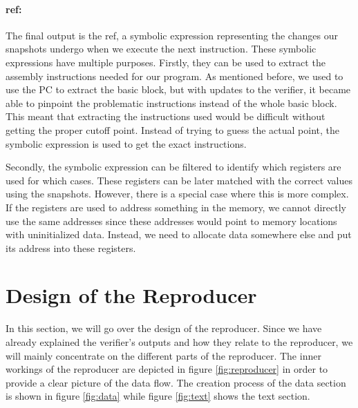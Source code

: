 \paragraph{ref:}
The final output is the ref, a symbolic expression representing the changes our snapshots undergo when we execute the next instruction.
These symbolic expressions have multiple purposes.
Firstly, they can be used to extract the assembly instructions needed for our program.
As mentioned before, we used to use the PC to extract the basic block, but with updates to the verifier, it became able to pinpoint the problematic instructions instead of the whole basic block.
This meant that extracting the instructions used would be difficult without getting the proper cutoff point.
Instead of trying to guess the actual point, the symbolic expression is used to get the exact instructions.

Secondly, the symbolic expression can be filtered to identify which registers are used for which cases.
These registers can be later matched with the correct values using the snapshots.
However, there is a special case where this is more complex.
If the registers are used to address something in the memory, we cannot directly use the same addresses since these addresses would point to memory locations with uninitialized data.
Instead, we need to allocate data somewhere else and put its address into these registers.

\section{Design of the Reproducer}
In this section, we will go over the design of the reproducer.
Since we have already explained the verifier's outputs and how they relate to the reproducer, we will mainly concentrate on the different parts of the reproducer.
The inner workings of the reproducer are depicted in figure \ref{fig:reproducer} in order to provide a clear picture of the data flow.
The creation process of the data section is shown in figure \ref{fig:data} while figure \ref{fig:text} shows the text section.


